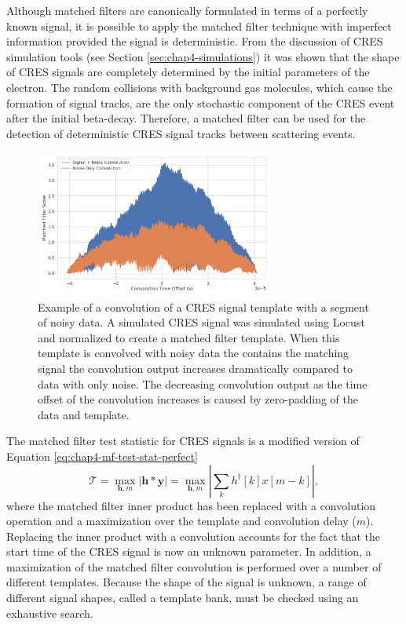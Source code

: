 Although matched filters are canonically formulated in terms of a perfectly known signal, it is possible to apply the matched filter technique with imperfect information provided the signal is deterministic. From the discussion of CRES simulation tools (see Section \ref{sec:chap4-simulations}) it was shown that the shape of CRES signals are completely determined by the initial parameters of the electron. The random collisions with background gas molecules, which cause the formation of signal tracks, are the only stochastic component of the CRES event after the initial beta-decay. Therefore, a matched filter can be used for the detection of deterministic CRES signal tracks between scattering events.

\begin{figure}[htbp]
    \centering
    \includegraphics*[width=0.7\textwidth]{figs/Chapter-4/220318_example_convolution.png}
    \caption{Example of a convolution of a CRES signal template with a segment of noisy data. A simulated CRES signal was simulated using Locust and normalized to create a matched filter template. When this template is convolved with noisy data the contains the matching signal the convolution output increases dramatically compared to data with only noise. The decreasing convolution output as the time offset of the convolution increases is caused by zero-padding of the data and template. }
\end{figure}

The matched filter test statistic for CRES signals is a modified version of Equation \ref{eq:chap4-mf-test-stat-perfect}
\begin{equation}
    \mathcal{T} = \max_{\bm{h},m}\left|\bm{h}\ast\bm{y}\right|=\max_{\bm{h},m}\left|\sum_{k}h^\dagger[k]x[m-k]\right|,
    \label{eq:chap4-mf-test-stat-conv}
\end{equation}
where the matched filter inner product has been replaced with a convolution operation and a maximization over the template and convolution delay ($m$). Replacing the inner product with a convolution accounts for the fact that the start time of the CRES signal is now an unknown parameter. In addition, a maximization of the matched filter convolution is performed over a number of different templates. Because the shape of the signal is unknown, a range of different signal shapes, called a template bank, must be checked using an exhaustive search.

